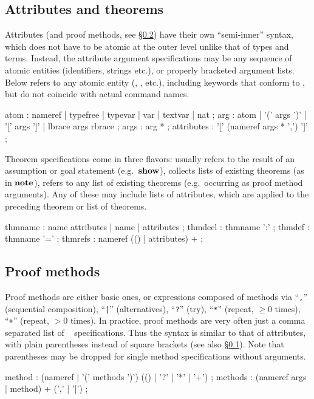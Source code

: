 \subsection{Attributes and theorems}\label{sec:syn-att}

Attributes (and proof methods, see \S\ref{sec:syn-meth}) have their own
``semi-inner'' syntax, which does not have to be atomic at the outer level
unlike that of types and terms.  Instead, the attribute argument
specifications may be any sequence of atomic entities (identifiers, strings
etc.), or properly bracketed argument lists.  Below  refers to
any atomic entity (, ,
 etc.), including keywords that conform to
, but do not coincide with actual command names.

\begin{rail}
  atom : nameref | typefree | typevar | var | textvar | nat
  ;
  arg : atom | '(' args ')' | '[' args ']' | lbrace args rbrace
  ;
  args : arg *
  ;
  attributes : '[' (nameref args * ',') ']'
  ;
\end{rail}

Theorem specifications come in three flavors:  usually
refers to the result of an assumption or goal statement (e.g.\ ${\mathord{\mathbf{show}}}$),
 collects lists of existing theorems (as in ${\mathord{\mathbf{note}}}$),
 refers to any list of existing theorems (e.g.\ occurring
as proof method arguments).  Any of these may include lists of attributes,
which are applied to the preceding theorem or list of theorems.

\begin{rail}
  thmname : name attributes | name | attributes
  ;
  thmdecl : thmname ':'
  ;
  thmdef : thmname '='
  ;
  thmrefs : nameref (() | attributes) +
  ;
\end{rail}


\subsection{Proof methods}\label{sec:syn-meth}

Proof methods are either basic ones, or expressions composed of methods via
``\texttt{,}'' (sequential composition), ``\texttt{|}'' (alternatives),
``\texttt{?}'' (try), ``\texttt{*}'' (repeat, ${} \ge 0$ times),
``\texttt{+}'' (repeat, ${} > 0$ times).  In practice, proof methods are very
often just a comma separated list of ~
specifications.  Thus the syntax is similar to that of attributes, with plain
parentheses instead of square brackets (see also \S\ref{sec:syn-att}).  Note
that parentheses may be dropped for single method specifications without
arguments.

\begin{rail}
  method : (nameref | '(' methods ')') (() | '?' | '*' | '+')
  ;
  methods : (nameref args | method) + (',' | '|')
  ;
\end{rail}


